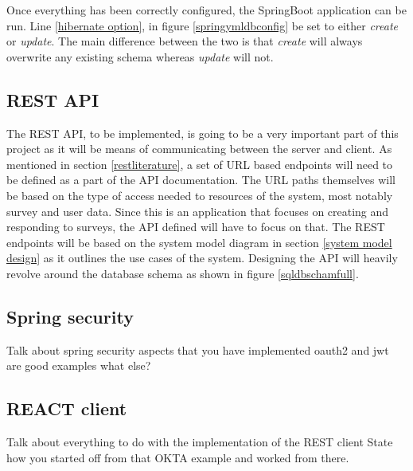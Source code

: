 Once everything has been correctly configured, the SpringBoot application can be run.
Line \ref{hibernate option}, in figure \ref{springymldbconfig} be set to either \textit{create} or \textit{update}.
The main difference between the two is that \textit{create} will always overwrite any existing schema whereas \textit{update} will not.



\subsection{REST API}

The REST API, to be implemented, is going to be a very important part of this project as it will be means of communicating between
the server and client. 
As mentioned in section \ref{restliterature}, a set of URL based endpoints will need to be defined as a part of the API 
documentation.
The URL paths themselves will be based on the type of access needed to resources of the system, most notably survey and user data.
Since this is an application that focuses on creating and responding to surveys, the API defined will have to focus on that.
The REST endpoints will be based on the system model diagram in section \ref{system model design} as it outlines the use cases 
of the system.
Designing the API will heavily revolve around the database schema as shown in figure \ref{sqldbschamfull}.





\subsection{Spring security}

Talk about spring security aspects that you have implemented
oauth2 and jwt are good examples
what else?



\subsection{REACT client}
Talk about everything to do with the implementation of the REST client
State how you started off from that OKTA example and worked from there. 
